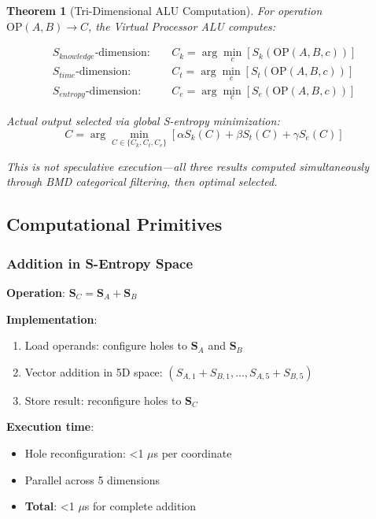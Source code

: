\documentclass[11pt,a4paper]{article}
\newtheorem{theorem}{Theorem}[section]
\begin{document}
\begin{theorem}[Tri-Dimensional ALU Computation]
For operation $\text{OP}(A, B) \rightarrow C$, the Virtual Processor ALU computes:

\begin{align}
S_{knowledge}\text{-dimension}: \quad &C_k = \arg\min_{c} [S_k(\text{OP}(A,B,c))] \\
S_{time}\text{-dimension}: \quad &C_t = \arg\min_{c} [S_t(\text{OP}(A,B,c))] \\
S_{entropy}\text{-dimension}: \quad &C_e = \arg\min_{c} [S_e(\text{OP}(A,B,c))]
\end{align}

Actual output selected via global S-entropy minimization:
\begin{equation}
C = \arg\min_{C \in \{C_k, C_t, C_e\}} [\alpha S_k(C) + \beta S_t(C) + \gamma S_e(C)]
\end{equation}

This is \textit{not} speculative execution—all three results computed simultaneously through BMD categorical filtering, then optimal selected.
\end{theorem}

\subsection{Computational Primitives}

\subsubsection{Addition in S-Entropy Space}

\textbf{Operation}: $\mathbf{S}_C = \mathbf{S}_A + \mathbf{S}_B$

\textbf{Implementation}:
\begin{enumerate}
\item Load operands: configure holes to $\mathbf{S}_A$ and $\mathbf{S}_B$
\item Vector addition in 5D space: $(S_{A,1} + S_{B,1}, \ldots, S_{A,5} + S_{B,5})$
\item Store result: reconfigure holes to $\mathbf{S}_C$
\end{enumerate}

\textbf{Execution time}:
\begin{itemize}
\item Hole reconfiguration: <1 $\mu$s per coordinate
\item Parallel across 5 dimensions
\item \textbf{Total}: <1 $\mu$s for complete addition
\end{itemize}
\end{document}

